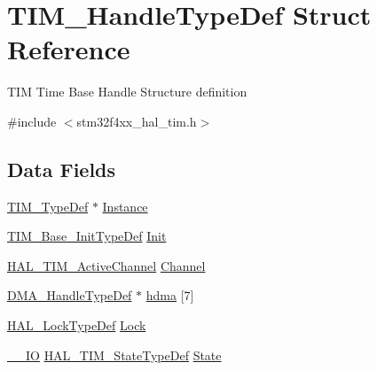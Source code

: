 \hypertarget{struct_t_i_m___handle_type_def}{}\section{T\+I\+M\+\_\+\+Handle\+Type\+Def Struct Reference}
\label{struct_t_i_m___handle_type_def}


T\+IM Time Base Handle Structure definition ~\newline
  




{\ttfamily \#include $<$stm32f4xx\+\_\+hal\+\_\+tim.\+h$>$}

\subsection*{Data Fields}
\begin{DoxyCompactItemize}
\item 
\mbox{\hyperlink{struct_t_i_m___type_def}{T\+I\+M\+\_\+\+Type\+Def}} $\ast$ \mbox{\hyperlink{struct_t_i_m___handle_type_def_a4076faade36875a6a05767135bb70b86}{Instance}}
\item 
\mbox{\hyperlink{struct_t_i_m___base___init_type_def}{T\+I\+M\+\_\+\+Base\+\_\+\+Init\+Type\+Def}} \mbox{\hyperlink{struct_t_i_m___handle_type_def_a21046dd4833b51c8e3f5c82ea134d03c}{Init}}
\item 
\mbox{\hyperlink{group___t_i_m___exported___types_gaa3fa7bcbb4707f1151ccfc90a8cf9706}{H\+A\+L\+\_\+\+T\+I\+M\+\_\+\+Active\+Channel}} \mbox{\hyperlink{struct_t_i_m___handle_type_def_a57eac61d1d06cad73bdd26dabe961753}{Channel}}
\item 
\mbox{\hyperlink{group___d_m_a___exported___types_ga41b754a906b86bce54dc79938970138b}{D\+M\+A\+\_\+\+Handle\+Type\+Def}} $\ast$ \mbox{\hyperlink{struct_t_i_m___handle_type_def_ac129fca4918fc510a515d89370aa9006}{hdma}} \mbox{[}7\mbox{]}
\item 
\mbox{\hyperlink{stm32f4xx__hal__def_8h_ab367482e943333a1299294eadaad284b}{H\+A\+L\+\_\+\+Lock\+Type\+Def}} \mbox{\hyperlink{struct_t_i_m___handle_type_def_ad4cf225029dbefe8d3fe660c33b8bb6b}{Lock}}
\item 
\mbox{\hyperlink{core__sc300_8h_aec43007d9998a0a0e01faede4133d6be}{\+\_\+\+\_\+\+IO}} \mbox{\hyperlink{group___t_i_m___exported___types_gae0994cf5970e56ca4903e9151f40010c}{H\+A\+L\+\_\+\+T\+I\+M\+\_\+\+State\+Type\+Def}} \mbox{\hyperlink{struct_t_i_m___handle_type_def_ad4c7388b23a70d7a1a257d6c94df29f3}{State}}
\end{DoxyCompactItemize}


